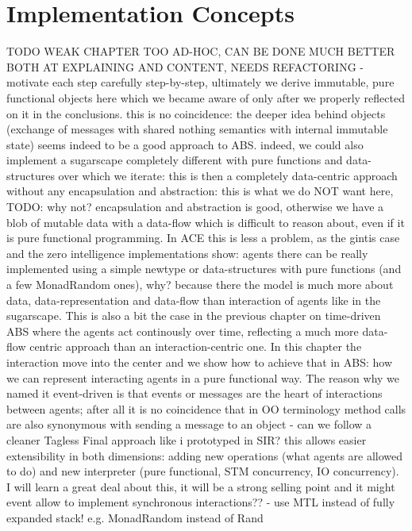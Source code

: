 \section{Implementation Concepts}
\label{sec:eventdriven_implementation}

TODO WEAK CHAPTER TOO AD-HOC, CAN BE DONE MUCH BETTER BOTH AT EXPLAINING AND CONTENT, NEEDS REFACTORING
- motivate each step carefully step-by-step, ultimately we derive immutable, pure functional objects here which we became aware of only after we properly reflected on it in the conclusions. this is no coincidence: the deeper idea behind objects (exchange of messages with shared nothing semantics with internal immutable state) seems indeed to be a good approach to ABS. indeed, we could also implement a sugarscape completely different with pure functions and data-structures over which we iterate: this is then a completely data-centric approach without any encapsulation and abstraction: this is what we do NOT want here, TODO: why not? encapsulation and abstraction is good, otherwise we have a blob of mutable data with a data-flow which is difficult to reason about, even if it is pure functional programming. In ACE this is less a problem, as the gintis case and the zero intelligence implementations show: agents there can be really implemented using a simple newtype or data-structures with pure functions (and a few MonadRandom ones), why? because there the model is much more about data, data-representation and data-flow than interaction of agents like in the sugarscape.
This is also a bit the case in the previous chapter on time-driven ABS where the agents act continously over time, reflecting a much more data-flow centric approach than an interaction-centric one. In this chapter the interaction move into the center and we show how to achieve that in ABS: how we can represent interacting agents in a pure functional way. The reason why we named it event-driven is that events or messages are the heart of interactions between agents; after all it is no coincidence that in OO terminology method calls are also synonymous with sending a message to an object
- can we follow a cleaner Tagless Final approach like i prototyped in SIR? this allows easier extensibility in both dimensions: adding new operations (what agents are allowed to do) and new interpreter (pure functional, STM concurrency, IO concurrency). I will learn a great deal about this, it will be a strong selling point and it might event allow to implement synchronous interactions?? 
- use MTL instead of fully expanded stack! e.g. MonadRandom instead of Rand
